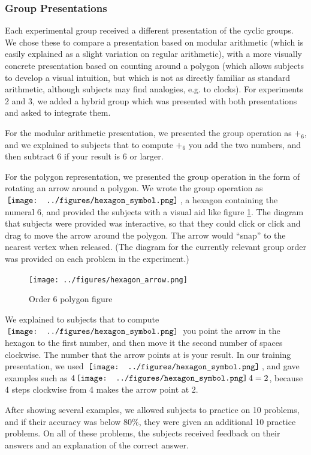 \documentclass[man,10pt]{apa6}
\newcommand{\hex}{\,\vcenter{\hbox{\texttt{[image: ../figures/hexagon\_symbol.png]}}}\,}
\begin{document}
\subsubsection{Group Presentations}
Each experimental group received a different presentation of the cyclic groups. We chose these to compare a presentation based on modular arithmetic (which is easily explained as a slight variation on regular arithmetic), with a more visually concrete presentation based on counting around a polygon (which allows subjects to develop a visual intuition, but which is not as directly familiar as standard arithmetic, although subjects may find analogies, e.g. to clocks). For experiments 2 and 3, we added a hybrid group which was presented with both presentations and asked to integrate them. \par 
For the modular arithmetic presentation, we presented the group operation as $+_6$, and we explained to subjects that to compute $+_6$ you add the two numbers, and then subtract $6$ if your result is $6$ or larger.\par
For the polygon representation, we presented the group operation in the form of rotating an arrow around a polygon. We wrote the group operation as $\hex$, a hexagon containing the numeral $6$, and provided the subjects with a visual aid like figure \ref{hexagonex}. The diagram that subjects were provided was interactive, so that they could click or click and drag to move the arrow around the polygon. The arrow would ``snap'' to the nearest vertex when released. (The diagram for the currently relevant group order was provided on each problem in the experiment.)
\begin{figure} \centering \texttt{[image: ../figures/hexagon\_arrow.png]} \caption{Order 6 polygon figure} \label{hexagonex} \end{figure} \noindent
We explained to subjects that to compute $\hex$ you point the arrow in the hexagon to the first number, and then move it the second number of spaces clockwise. The number that the arrow points at is your result. In our training presentation, we used $\hex$, and gave examples such as $4 \hex 4 = 2$, because 4 steps clockwise from 4 makes the arrow point at 2. \par
After showing several examples, we allowed subjects to practice on 10 problems, and if their accuracy was below 80\%, they were given an additional 10 practice problems. On all of these problems, the subjects received feedback on their answers and an explanation of the correct answer. \par 
\end{document}
